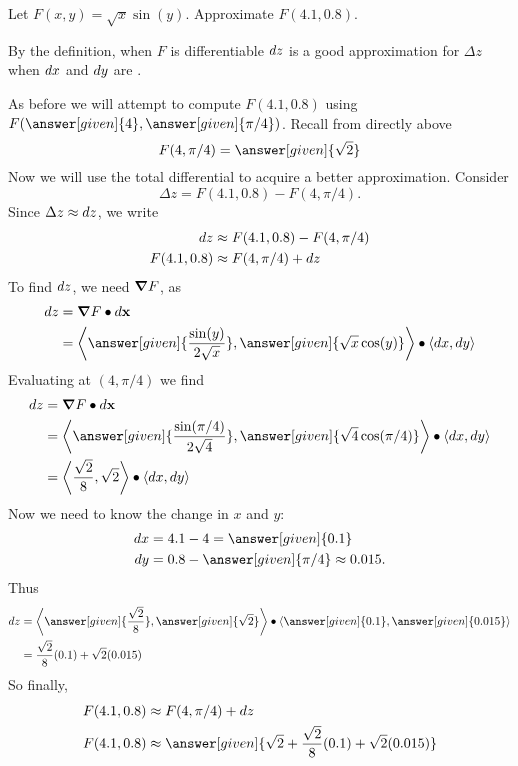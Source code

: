 \documentclass{ximera}
\begin{document}
\begin{example}
  Let $F(x,y)=\sqrt{x}\sin(y)$. Approximate $F(4.1,0.8)$.
  \begin{explanation}
    By the definition, when $F$ is differentiable $\mathop{}\!d z$ is a good
    approximation for $\Delta z$ when $\mathop{}\!d x$ and $\mathop{}\!d y$ are
    .

    As before we will attempt to compute $F(4.1,0.8)$ using
    $F(\answer[given]{4},\answer[given]{\pi/4})$. Recall from directly above
    \[
    F(4,\pi/4) = \answer[given]{\sqrt{2}}
    \]
    Now we will use the total differential to acquire a better
    approximation.  Consider
    \[
    \Delta z = F(4.1,0.8) - F(4,\pi/4).
    \]
    Since $\Delta z\approx \mathop{}\!d z$, we write
    \begin{align*}
      \mathop{}\!d z &\approx F(4.1,0.8) - F(4,\pi/4)\\
      F(4.1,0.8) &\approx F(4,\pi/4)+ \mathop{}\!d z 
    \end{align*}
    To find $\mathop{}\!d z$, we need $\boldsymbol\nabla F$, as
    \begin{align*}
      \d z &= \grad F \dotp \d\vec{x}\\
      &=\vector{\answer[given]{\frac{\sin (y)}{2\sqrt{x}}},\answer[given]{\sqrt{x}\cos (y)}}\dotp\vector{\d x,\d y}
    \end{align*}
    Evaluating at $(4,\pi/4)$ we find
    \begin{align*}
      \d z &= \grad F \dotp \d\vec{x}\\
      &=\vector{\answer[given]{\frac{\sin (\pi/4)}{2\sqrt{4}}}, \answer[given]{\sqrt{4}\cos (\pi/4)}}\dotp\vector{\d x,\d y }\\
      &=\vector{\frac{\sqrt{2}}{8}, \sqrt{2}}\dotp\vector{\d x,\d y }
    \end{align*}
    Now we need to know the change in $x$ and $y$:
    \begin{align*}
      \d x &= 4.1-4= \answer[given]{0.1}\\
    \d y &= 0.8 -\answer[given]{\pi/4} \approx 0.015.\\
    \end{align*}
    Thus
    \begin{align*}
      \d z &=  \vector{\answer[given]{\frac{\sqrt{2}}{8}}, \answer[given]{\sqrt{2}}}\dotp\vector{\answer[given]{0.1},\answer[given]{0.015}}\\ 
      &= \frac{\sqrt{2}}8(0.1) + \sqrt{2}(0.015)\\
    \end{align*}
    So finally,
    \begin{align*}
    F(4.1,0.8) &\approx F(4,\pi/4) + \d z\\
    F(4.1,0.8) &\approx \answer[given]{\sqrt{2} + \frac{\sqrt{2}}8(0.1) + \sqrt{2}(0.015)}
    \end{align*}
  \end{explanation}
\end{example}
\end{document}
